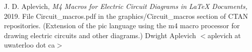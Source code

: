 J. D. Aplevich,
{\it M4 Macros for Electric Circuit Diagrams in LaTeX Documents,}
2019.
File Circuit\_macros.pdf in the graphics/Circuit\_macros section
of CTAN repositories.
(Extension of the pic
language using the m4 macro processor for drawing electric circuits
and other diagrams.)
%
    Dwight Aplevich $<$aplevich at uwaterloo dot ca$>$
%
%
